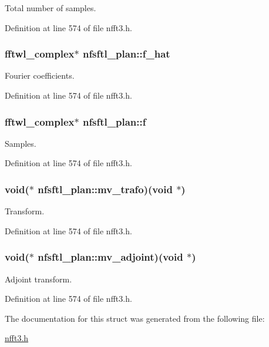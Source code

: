 Total number of samples. 



Definition at line 574 of file nfft3.\-h.

\hypertarget{structnfsftl__plan_ab9243951baccdf59de326cada1c08853}{
\subsubsection[{f\-\_\-hat}]{\setlength{\rightskip}{0pt plus 5cm}fftwl\-\_\-complex$\ast$ nfsftl\-\_\-plan\-::f\-\_\-hat}}\label{structnfsftl__plan_ab9243951baccdf59de326cada1c08853}


Fourier coefficients. 



Definition at line 574 of file nfft3.\-h.

\hypertarget{structnfsftl__plan_ad27b30233039fea75a9e1bc885324f3d}{
\subsubsection[{f}]{\setlength{\rightskip}{0pt plus 5cm}fftwl\-\_\-complex$\ast$ nfsftl\-\_\-plan\-::f}}\label{structnfsftl__plan_ad27b30233039fea75a9e1bc885324f3d}


Samples. 



Definition at line 574 of file nfft3.\-h.

\hypertarget{structnfsftl__plan_ab1a7dae6c0f2b18d4eda2e32195bba95}{
\subsubsection[{mv\-\_\-trafo}]{\setlength{\rightskip}{0pt plus 5cm}void($\ast$ nfsftl\-\_\-plan\-::mv\-\_\-trafo)(void $\ast$)}}\label{structnfsftl__plan_ab1a7dae6c0f2b18d4eda2e32195bba95}


Transform. 



Definition at line 574 of file nfft3.\-h.

\hypertarget{structnfsftl__plan_a162601fc8aa3248af806908e160d3c14}{
\subsubsection[{mv\-\_\-adjoint}]{\setlength{\rightskip}{0pt plus 5cm}void($\ast$ nfsftl\-\_\-plan\-::mv\-\_\-adjoint)(void $\ast$)}}\label{structnfsftl__plan_a162601fc8aa3248af806908e160d3c14}


Adjoint transform. 



Definition at line 574 of file nfft3.\-h.



The documentation for this struct was generated from the following file\-:\begin{DoxyCompactItemize}
\item 
\hyperlink{nfft3_8h}{nfft3.\-h}\end{DoxyCompactItemize}
